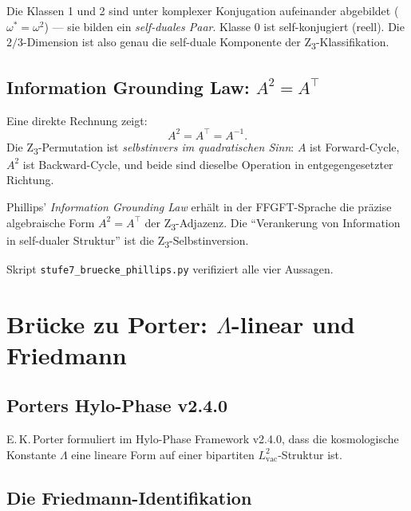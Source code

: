 Die Klassen 1 und 2 sind unter komplexer Konjugation aufeinander abgebildet (\(\omega^* = \omega^2\)) — sie bilden ein \emph{self-duales Paar}. Klasse 0 ist self-konjugiert (reell). Die \(2/3\)-Dimension ist also genau die self-duale Komponente der Z\textsubscript{3}-Klassifikation.

\subsection[Information Grounding Law: $A^2=A^T$]{Information Grounding Law: \(A^2 = A^\top\)}

Eine direkte Rechnung zeigt:
\begin{equation}
A^2 = A^\top = A^{-1}.
\label{eq:igl}
\end{equation}
Die Z\textsubscript{3}-Permutation ist \emph{selbstinvers im quadratischen Sinn}: \(A\) ist Forward-Cycle, \(A^2\) ist Backward-Cycle, und beide sind dieselbe Operation in entgegengesetzter Richtung.

\begin{interpretation}
Phillips' \emph{Information Grounding Law} erhält in der FFGFT-Sprache die präzise algebraische Form \(A^2 = A^\top\) der Z\textsubscript{3}-Adjazenz. Die ``Verankerung von Information in self-dualer Struktur'' ist die Z\textsubscript{3}-Selbstinversion.
\end{interpretation}

Skript \texttt{stufe7\_bruecke\_phillips.py} verifiziert alle vier Aussagen.

\section[Brücke zu Porter: Lambda-linear und Friedmann]{Brücke zu Porter: \(\Lambda\)-linear und Friedmann}
\label{sec:porter}

\subsection{Porters Hylo-Phase v2.4.0}

E.\,K.\,Porter formuliert im Hylo-Phase Framework v2.4.0, dass die kosmologische Konstante \(\Lambda\) eine lineare Form auf einer bipartiten \(L_\text{vac}^2\)-Struktur ist.

\subsection{Die Friedmann-Identifikation}

